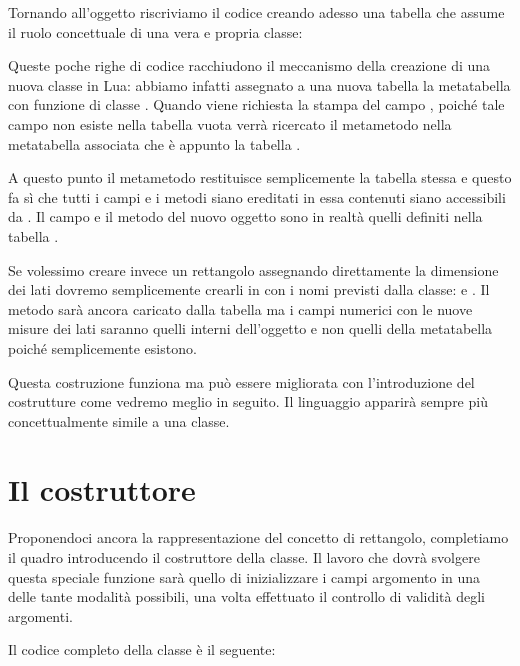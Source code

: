Tornando all'oggetto  riscriviamo il codice creando adesso una
tabella che assume il ruolo concettuale di una vera e propria classe:

Queste poche righe di codice racchiudono il meccanismo della creazione di una
nuova classe in Lua: abbiamo infatti assegnato a una nuova tabella  la
metatabella con funzione di classe . Quando viene richiesta la
stampa del campo , poiché tale campo non esiste nella tabella
vuota  verrà ricercato il metametodo  nella metatabella
associata che è appunto la tabella .

A questo punto il metametodo restituisce semplicemente la tabella
 stessa e questo fa sì che tutti i campi e i metodi siano
ereditati in essa contenuti siano accessibili da . Il campo
 e il metodo  del nuovo oggetto  sono in realtà
quelli definiti nella tabella .

Se volessimo creare invece un rettangolo assegnando direttamente la dimensione
dei lati dovremo semplicemente crearli in  con i nomi previsti dalla
classe:  e . Il metodo  sarà ancora
caricato dalla tabella  ma i campi numerici con le nuove misure
dei lati saranno quelli interni dell'oggetto  e non quelli della
metatabella poiché semplicemente esistono.

Questa costruzione funziona ma può essere migliorata con l'introduzione del
costrutture come vedremo meglio in seguito. Il linguaggio apparirà sempre più
concettualmente simile a una classe.


\section{Il costruttore}

Proponendoci ancora la rappresentazione del concetto di rettangolo, completiamo
il quadro introducendo il costruttore della classe. Il lavoro che dovrà
svolgere questa speciale funzione sarà quello di inizializzare i campi
argomento in una delle tante modalità possibili, una volta effettuato il
controllo di validità degli argomenti.

Il codice completo della classe  è il seguente:

